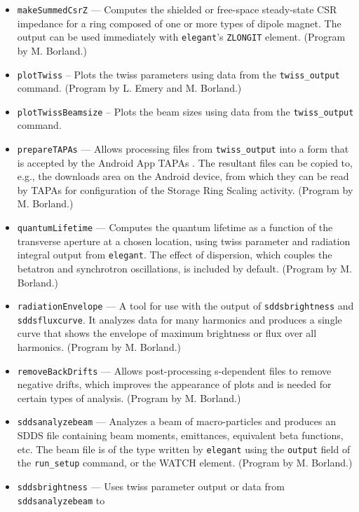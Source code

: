 \documentclass[11pt]{article}
\begin{document}
\begin{itemize}
  bunch lengthening and output these to a file that can be use with \verb|load_parameters|.
  (Program by M. Borland.)
\item {\tt makeSummedCsrZ} --- Computes the shielded or free-space steady-state CSR impedance for a ring
  composed of one or more types of dipole magnet.
 The output can be used immediately with {\tt elegant}'s \verb|ZLONGIT| element.
  (Program by M. Borland.)
\item {\tt plotTwiss} -- Plots the twiss parameters using data from the \verb|twiss_output| command.
  (Program by L. Emery and M. Borland.)
\item {\tt plotTwissBeamsize} -- Plots the beam sizes using data from the \verb|twiss_output| command.
\item {\tt prepareTAPAs} --- Allows processing files from \verb|twiss_output| into a form
  that is accepted by the Android App TAPAs \cite{TAPAs}. The resultant files can be copied to, e.g., 
  the downloads area on the Android device, from which they can be read by TAPAs for configuration of
  the Storage Ring Scaling activity.
  (Program by M. Borland.)
\item {\tt quantumLifetime} --- Computes the quantum lifetime as a function of the transverse aperture at a
  chosen location, using twiss parameter and radiation integral output from {\tt elegant}.  The effect of
  dispersion, which couples the betatron and synchrotron oscillations, is included by default.
  (Program by M. Borland.)
\item {\tt radiationEnvelope} --- A tool for use with the output of {\tt sddsbrightness} and {\tt sddsfluxcurve}.
  It analyzes data for many harmonics and produces a single curve that shows the envelope of maximum
  brightness or flux over all harmonics.
  (Program by M. Borland.)
\item {\tt removeBackDrifts} --- Allows post-processing s-dependent files to remove negative drifts, which
  improves the appearance of plots and is needed for certain types of analysis.
  (Program by M. Borland.)
\item {\tt sddsanalyzebeam} --- Analyzes a beam of macro-particles and produces an SDDS file
        containing beam moments, emittances, equivalent beta functions, etc.  The beam file
        is of the type written by {\tt elegant} using the {\tt output} field of the {\tt run\_setup}
        command, or the WATCH element.  (Program by M. Borland.)
\item {\tt sddsbrightness} --- Uses twiss parameter output or data from {\tt sddsanalyzebeam} to

\end{itemize}
\end{document}

